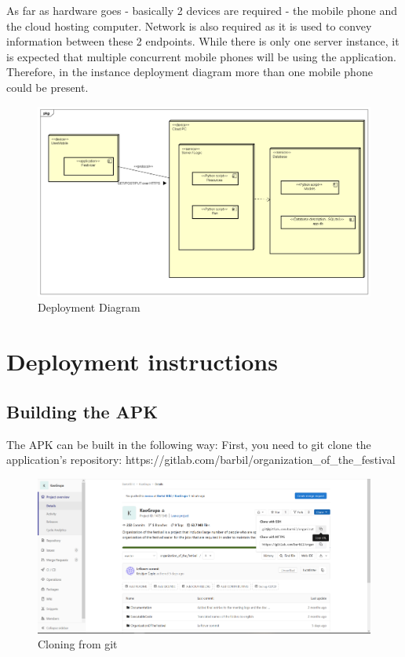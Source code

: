 			As far as hardware goes - basically 2 devices are required - the mobile phone and the cloud hosting computer. Network is also required as it is used to convey
			information between these 2 endpoints. While there is only one server instance, it is expected that multiple concurrent mobile phones will be using the application. Therefore, in the instance deployment diagram more than one mobile phone could be present.
		
			\begin{figure}[H]
				\includegraphics[width=\linewidth]{diagrams/Deployment Diagram0.png}
				\caption{Deployment Diagram}
				\label{fig:deployment_diag}
			\end{figure}
		
			\eject			
		\section{Deployment instructions}
			
			\subsection{Building the APK}
			
			The APK can be built in the following way:
			First, you need to git clone the application's repository: https://gitlab.com/barbil/organization_of_the_festival
			
			\begin{figure}[H]
				\includegraphics[width=\linewidth]{images/Deploy_M_1.png}
				\caption{Cloning from git}
				\label{fig:install_1}
			\end{figure}
			
